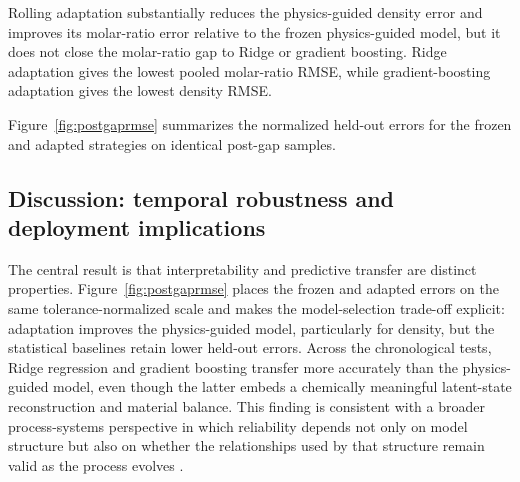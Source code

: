 \documentclass[preprint,12pt,authoryear]{elsarticle}
\begin{document}
\begin{table}[htbp]
\centering
\caption{Post-gap rolling comparison on identical held-out samples (10 windows, 357 pooled test pairs).}
\label{tab:postgapcomparison}
\end{table}

Rolling adaptation substantially reduces the physics-guided density error and improves its molar-ratio error relative to the frozen physics-guided model, but it does not close the molar-ratio gap to Ridge or gradient boosting. Ridge adaptation gives the lowest pooled molar-ratio RMSE, while gradient-boosting adaptation gives the lowest density RMSE.

Figure~\ref{fig:postgaprmse} summarizes the normalized held-out errors for the frozen and adapted strategies on identical post-gap samples.

\subsection{Discussion: temporal robustness and deployment implications}

The central result is that interpretability and predictive transfer are distinct properties. Figure~\ref{fig:postgaprmse} places the frozen and adapted errors on the same tolerance-normalized scale and makes the model-selection trade-off explicit: adaptation improves the physics-guided model, particularly for density, but the statistical baselines retain lower held-out errors. Across the chronological tests, Ridge regression and gradient boosting transfer more accurately than the physics-guided model, even though the latter embeds a chemically meaningful latent-state reconstruction and material balance. This finding is consistent with a broader process-systems perspective in which reliability depends not only on model structure but also on whether the relationships used by that structure remain valid as the process evolves \citep{kadlec2009,offermans2024,metcalfe2025,zhai2025}.
\end{document}
